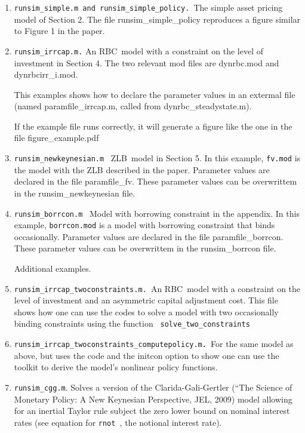 \documentclass[12pt]{article}
\begin{document}
\begin{enumerate}
\item \texttt{runsim\_simple.m and runsim\_simple\_policy. }The simple asset
pricing model of Section 2. The file runsim\_simple\_policy reproduces a
figure similar to Figure 1 in the paper.

\item \texttt{runsim\_irrcap.m.} An RBC\ model with a constraint on the
level of investment in Section 4. The two relevant mod files are dynrbc.mod
and dynrbcirr\_i.mod.

This examples shows how to declare the parameter values in an extermal file
(named paramfile\_irrcap.m, called from dynrbc\_steadystate.m).

If the example file runs correctly, it will generate a figure like the one
in the file figure\_example.pdf

\item \texttt{runsim\_newkeynesian.m} \ ZLB\ model in Section 5. In this
example, \texttt{fv.mod} is the model with the ZLB described in the paper.
Parameter values are declared in the file paramfile\_fv. These parameter
values can be overwrittem in the runsim\_newkeynesian file.

\item \texttt{runsim\_borrcon.m} \ Model with borrowing constraint in the
appendix. In this example, \texttt{borrcon.mod} is a model with borrowing
constraint that binds occasionally. Parameter values are declared in the
file paramfile\_borrcon. These parameter values can be overwrittem in the
runsim\_borrcon file.

\medskip 

Additional examples.

\item \texttt{runsim\_irrcap\_twoconstraints.m. }An RBC\ model with a
constraint on the level of investment and an asymmetric capital adjustment
cost. This file shows how one can use the codes to solve a model with two
occasionally binding constraints using the function \texttt{%
solve\_two\_constraints}

\item \texttt{runsim\_irrcap\_twoconstraints\_computepolicy.m. }For the same
model as above, but uses the code and the initcon option to show one can use
the toolkit to derive the model's nonlinear policy functions.

\item \texttt{runsim\_cgg.m}. Solves a version of the Clarida-Gali-Gertler
(\textquotedblleft The Science of Monetary Policy: A New Keynesian
Perspective, JEL, 2009) model allowing for an inertial Taylor rule subject
the zero lower bound on nominal interest rates (see equation for \texttt{rnot%
}, the notional interest rate).


\end{enumerate}
\end{document}
